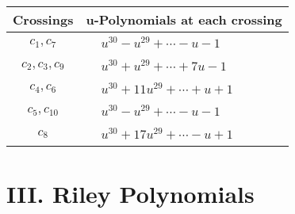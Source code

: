 \documentclass[1p]{elsarticle_modified}
\theoremstyle{definition}
\begin{document}
\begin{tabular}{m{50pt}|m{274pt}}
Crossings & \hspace{64pt}u-Polynomials at each crossing \\
\hline $$\begin{aligned}c_{1},c_{7}\end{aligned}$$&$\begin{aligned}
&u^{30}- u^{29}+\cdots- u-1
\end{aligned}$\\
\hline $$\begin{aligned}c_{2},c_{3},c_{9}\end{aligned}$$&$\begin{aligned}
&u^{30}+u^{29}+\cdots+7 u-1
\end{aligned}$\\
\hline $$\begin{aligned}c_{4},c_{6}\end{aligned}$$&$\begin{aligned}
&u^{30}+11 u^{29}+\cdots+u+1
\end{aligned}$\\
\hline $$\begin{aligned}c_{5},c_{10}\end{aligned}$$&$\begin{aligned}
&u^{30}- u^{29}+\cdots- u-1
\end{aligned}$\\
\hline $$\begin{aligned}c_{8}\end{aligned}$$&$\begin{aligned}
&u^{30}+17 u^{29}+\cdots- u+1
\end{aligned}$\\
\hline
\end{tabular}\newpage\renewcommand{\arraystretch}{1}
\centering \section*{ III. Riley Polynomials}
\end{document}
